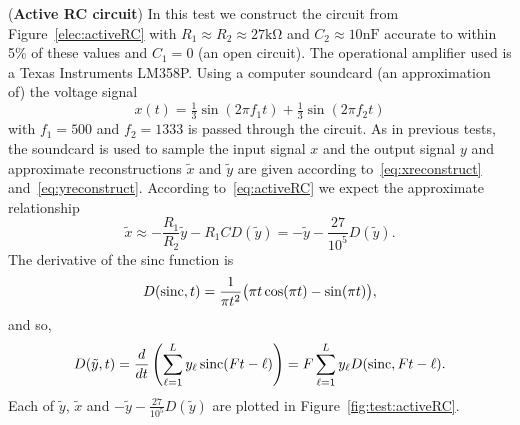 \begin{randomfloat}
\begin{test}\label{test:activeRCtest} 
(\textbf{Active RC circuit})
In this test we construct the circuit from Figure~\ref{elec:activeRC} with $R_1 \approx R_2 \approx 27\si{\kilo\ohm}$ and $C_2 \approx 10\si{\nano\farad}$ accurate to within 5\%  of these values and  $C_1 = 0$ (an open circuit).  The operational amplifier used is a Texas Instruments LM358P.  Using a computer soundcard (an approximation of) the voltage signal
\[
x(t) = \tfrac{1}{3}\sin( 2 \pi f_1 t) + \tfrac{1}{3}\sin( 2\pi f_2 t)
\]
with $f_1 = 500$ and $f_2 = 1333$ is passed through the circuit.  As in previous tests, the soundcard is used to sample the input signal $x$ and the output signal $y$ and approximate reconstructions $\tilde{x}$ and $\tilde{y}$ are given according to~\eqref{eq:xreconstruct} and~\eqref{eq:yreconstruct}.  According to~\eqref{eq:activeRC} we expect the approximate relationship
\[
\tilde{x} \approx -\frac{R_1}{R_2}\tilde{y} - R_1 C D(\tilde{y}) = - \tilde{y} - \frac{27}{10^5} D(\tilde{y}).
\]
The derivative of the sinc function is
\begin{equation}\label{eq:sincderivative}
D(\operatorname{sinc},t) = \frac{1}{\pi t^2} \big( \pi t \cos(\pi t) - \sin(\pi t) \big),
\end{equation}
and so,
\begin{equation}\label{eq:Dtildey}
D(\tilde{y},t) = \frac{d}{dt}\left(\sum_{\ell=1}^L y_\ell \operatorname{sinc}(F t - \ell) \right) = F \sum_{\ell=1}^L y_\ell D(\operatorname{sinc},F t -\ell).
\end{equation}
Each of $\tilde{y}$, $\tilde{x}$ and $-\tilde{y} - \tfrac{27}{10^5} D(\tilde{y})$ are plotted in Figure~\ref{fig:test:activeRC}. 


\end{test}
\end{randomfloat}
